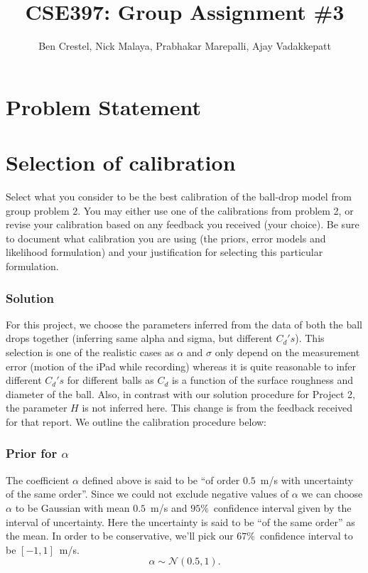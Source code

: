 \documentclass{article}
\begin{document}
\title{CSE397: Group Assignment \#3}


\author{Ben Crestel, Nick Malaya, Prabhakar Marepalli, Ajay Vadakkepatt}

\maketitle

\section*{Problem Statement}


\section{Selection of calibration}

Select what you consider to be the best calibration of the ball-drop
model from group problem 2. You may either use one of the calibrations
from problem 2, or revise your calibration based on any feedback you
received (your choice). Be sure to document what calibration you are
using (the priors, error models and likelihood formulation) and your
justification for selecting this particular formulation.


\subsubsection*{Solution}

For this project, we choose the parameters inferred from the data
of both the ball drops together (inferring same alpha and sigma, but
different $C_{d}'s$). This selection is one of the realistic cases
as $\alpha$ and $\sigma$ only depend on the measurement error (motion
of the iPad while recording) whereas it is quite reasonable to infer
different $C_{d}'s$ for different balls as $C_{d}$ is a function
of the surface roughness and diameter of the ball. Also, in contrast
with our solution procedure for Project 2, the parameter $H$ is not
inferred here. This change is from the feedback received for that
report. We outline the calibration procedure below:


\subsubsection*{Prior for $\alpha$}

The coefficient $\alpha$ defined above is said to be ``of order
$0.5$~m/s with uncertainty of the same order''. Since we could
not exclude negative values of $\alpha$ we can choose $\alpha$ to
be Gaussian with mean $0.5$~m/s and $95\%$~confidence interval
given by the interval of uncertainty. Here the uncertainty is said
to be ``of the same order'' as the mean. In order to be conservative,
we'll pick our $67\%$~confidence interval to be $[-1,1]$~m/s.
\[
\alpha\sim\mathcal{N}(0.5,1).
\]
\end{document}
